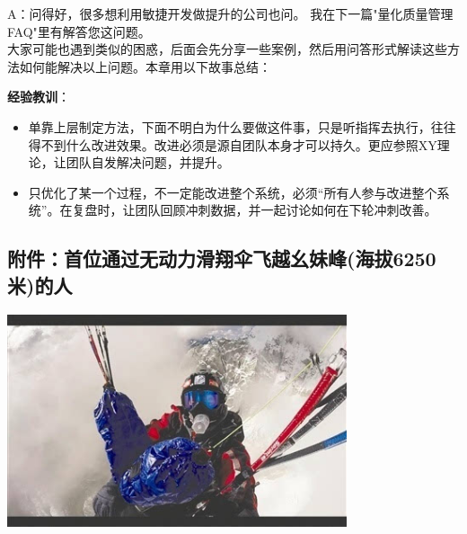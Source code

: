 A：问得好，很多想利用敏捷开发做提升的公司也问。
我在下一篇"量化质量管理FAQ"里有解答您这问题。\\
大家可能也遇到类似的困惑，后面会先分享一些案例，然后用问答形式解读这些方法如何能解决以上问题。本章用以下故事总结：


\textbf{经验教训}：

\begin{itemize}
\tightlist
\item
  单靠上层制定方法，下面不明白为什么要做这件事，只是听指挥去执行，往往得不到什么改进效果。改进必须是源自团队本身才可以持久。更应参照XY理论，让团队自发解决问题，并提升。
\item
  只优化了某一个过程，不一定能改进整个系统，必须``所有人参与改进整个系统''。在复盘时，让团队回顾冲刺数据，并一起讨论如何在下轮冲刺改善。
\end{itemize}

\hypertarget{ux9644ux4ef6ux9996ux4f4dux901aux8fc7ux65e0ux52a8ux529bux6ed1ux7fd4ux4f1eux98deux8d8aux5e7aux59b9ux5cf0ux6d77ux62d46250ux7c73ux7684ux4eba}{%
\subsection{附件：首位通过无动力滑翔伞飞越幺妹峰(海拔6250米)的人}\label{ux9644ux4ef6ux9996ux4f4dux901aux8fc7ux65e0ux52a8ux529bux6ed1ux7fd4ux4f1eux98deux8d8aux5e7aux59b9ux5cf0ux6d77ux62d46250ux7c73ux7684ux4eba}}


\includegraphics[width=10cm]{滑翔2.jpg}


